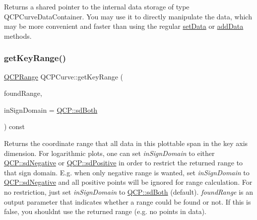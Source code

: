 Returns a shared pointer to the internal data storage of type Q\+C\+P\+Curve\+Data\+Container. You may use it to directly manipulate the data, which may be more convenient and faster than using the regular \hyperlink{classQCPCurve_a41246850d2e080bc57183ca19cd4135e}{set\+Data} or \hyperlink{classQCPCurve_a73edf394b94f3f24f07518e30565a07f}{add\+Data} methods. \mbox{\label{classQCPCurve_a22d09087f78f254731197cc0b8783299}} 
\subsubsection{\texorpdfstring{get\+Key\+Range()}{getKeyRange()}}
{\footnotesize\ttfamily \hyperlink{classQCPRange}{Q\+C\+P\+Range} Q\+C\+P\+Curve\+::get\+Key\+Range (\begin{DoxyParamCaption}\item[{bool \&}]{found\+Range,  }\item[{\hyperlink{namespaceQCP_afd50e7cf431af385614987d8553ff8a9}{Q\+C\+P\+::\+Sign\+Domain}}]{in\+Sign\+Domain = {\ttfamily \hyperlink{namespaceQCP_afd50e7cf431af385614987d8553ff8a9aa38352ef02d51ddfa4399d9551566e24}{Q\+C\+P\+::sd\+Both}} }\end{DoxyParamCaption}) const\hspace{0.3cm}{\ttfamily [virtual]}}

Returns the coordinate range that all data in this plottable span in the key axis dimension. For logarithmic plots, one can set {\itshape in\+Sign\+Domain} to either \hyperlink{namespaceQCP_afd50e7cf431af385614987d8553ff8a9a2d18af0bc58f6528d1e82ce699fe4829}{Q\+C\+P\+::sd\+Negative} or \hyperlink{namespaceQCP_afd50e7cf431af385614987d8553ff8a9a584784b75fb816abcc627cf743bb699f}{Q\+C\+P\+::sd\+Positive} in order to restrict the returned range to that sign domain. E.\+g. when only negative range is wanted, set {\itshape in\+Sign\+Domain} to \hyperlink{namespaceQCP_afd50e7cf431af385614987d8553ff8a9a2d18af0bc58f6528d1e82ce699fe4829}{Q\+C\+P\+::sd\+Negative} and all positive points will be ignored for range calculation. For no restriction, just set {\itshape in\+Sign\+Domain} to \hyperlink{namespaceQCP_afd50e7cf431af385614987d8553ff8a9aa38352ef02d51ddfa4399d9551566e24}{Q\+C\+P\+::sd\+Both} (default). {\itshape found\+Range} is an output parameter that indicates whether a range could be found or not. If this is false, you shouldn\textquotesingle{}t use the returned range (e.\+g. no points in data).

